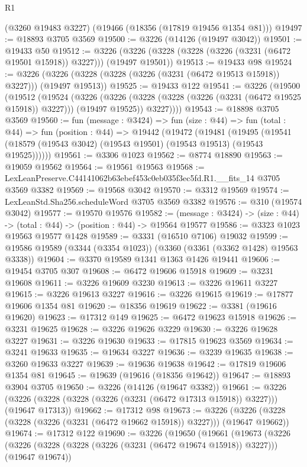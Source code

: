 \begin{lexlean}{R1}
\begin{coremodule}
    (@3260 @19483 @3227)
    (@19466 (@18356 (@17819 @19456 @1354 @81)))
@19497 := @18893 @3705 @3569
@19500 := @3226 (@14126 (@19497 @3042))
@19501 := @19433 @50
@19512 := @3226 (@3226 (@3228 (@3228 (@3226 (@3231 (@6472 @19501 @15918)) @3227))) (@19497 @19501))
@19513 := @19433 @98
@19524 := @3226 (@3226 (@3228 (@3228 (@3226 (@3231 (@6472 @19513 @15918)) @3227))) (@19497 @19513))
@19525 := @19433 @122
@19541 := @3226
    (@19500
      (@19512
        (@19524
          (@3226
            (@3226 (@3228 (@3228 (@3226 (@3231 (@6472 @19525 @15918)) @3227))) (@19497 @19525))
            @3227))))
@19543 := @18898 @3705 @3569
@19560 := fun (message : @3424) =>
  fun (size : @44) =>
  fun (total : @44) =>
  fun (position : @44) =>
  @19442
    (@19472
      (@19481
        (@19495 (@19541 (@18579 (@19543 @3042) (@19543 @19501) (@19543 @19513) (@19543 @19525))))))
@19561 := @3306 @1023
@19562 := @8774 @18890
@19563 := @19059 @19562
@19564 := @19561 @19563
@19568 := LexLeanPreserve.C44141062b63ebef453c0eb035f3ec5fd.R1.__fits_14 @3705 @3569 @3382
@19569 := @19568 @3042
@19570 := @3312 @19569
@19574 := LexLeanStd.Sha256.scheduleWord @3705 @3569 @3382
@19576 := @310 (@19574 @3042)
@19577 := @19570 @19576
@19582 := (message : @3424) -> (size : @44) -> (total : @44) -> (position : @44) -> @19564 @19577
@19586 := @3323 @1023 @19563 @19577 @1428
@19589 := @3331 (@16510 @7106) @19032
@19599 := @19586 @19589 (@3344 (@3354 @1023)) (@3360 (@3361 (@3362 @1428) @19563 @3338))
@19604 := @3370 @19589 @1341 @1363 @1426 @19441
@19606 := @19454 @3705 @307
@19608 := @6472 @19606 @15918
@19609 := @3231 @19608
@19611 := @3226 @19609 @3230
@19613 := @3226 @19611 @3227
@19615 := @3226 @19613 @3227
@19616 := @3226 @19615
@19619 := @17877 @19606 @1354 @81
@19620 := @18356 @19619
@19622 := @3381 (@19616 @19620)
@19623 := @17312 @149
@19625 := @6472 @19623 @15918
@19626 := @3231 @19625
@19628 := @3226 @19626 @3229
@19630 := @3226 @19628 @3227
@19631 := @3226 @19630
@19633 := @17815 @19623 @3569
@19634 := @3241 @19633
@19635 := @19634 @3227
@19636 := @3239 @19635
@19638 := @3260 @19633 @3227
@19639 := @19636 @19638
@19642 := @17819 @19606 @1354 @81
@19645 := @19639 (@19616 (@18356 @19642))
@19647 := @18893 @3904 @3705
@19650 := @3226 (@14126 (@19647 @3382))
@19661 := @3226 (@3226 (@3228 (@3228 (@3226 (@3231 (@6472 @17313 @15918)) @3227))) (@19647 @17313))
@19662 := @17312 @98
@19673 := @3226 (@3226 (@3228 (@3228 (@3226 (@3231 (@6472 @19662 @15918)) @3227))) (@19647 @19662))
@19674 := @17312 @122
@19690 := @3226
    (@19650
      (@19661
        (@19673
          (@3226
            (@3226 (@3228 (@3228 (@3226 (@3231 (@6472 @19674 @15918)) @3227))) (@19647 @19674))

\end{coremodule}
\end{lexlean}
